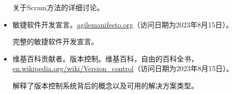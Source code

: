 \begin{itemize}
\hspace*{\fill}

关于Scrum方法的详细讨论。

\hspace*{\fill}

\item
敏捷软件开发宣言。\url{agilemanifesto.org}（访问日期为2023年8月15日）。

\hspace*{\fill}

完整的敏捷软件开发宣言。

\hspace*{\fill}

\item
维基百科贡献者。版本控制。维基百科，自由的百科全书，\url{en.wikipedia.org/wiki/Version_control}（访问日期为2023年8月15日）。

\hspace*{\fill}

解释了版本控制系统背后的概念以及可用的解决方案类型。
\end{itemize}
